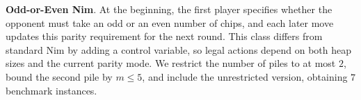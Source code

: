 \documentclass[review]{elsarticle}
\newcommand{\set}[1]{\{ #1 \}}
\newcommand{\tuple}[1]{\langle {#1} \rangle}
\newcommand{\true}{\top}
\newcommand{\statevar}{\mathcal{X}}
\newcommand{\act}{\mathcal{A}}
\newcommand{\constraint}{\mathcal{C}}
\newcommand{\estate}{\mathcal{E}}
\newcommand{\pre}{\mathtt{pre}}
\newcommand{\eff}{\mathtt{eff}}
\newcommand{\modulo}{\equiv}
\begin{document}
{\color{red}\textbf{Odd-or-Even Nim}. At the beginning, the first player specifies whether the opponent must take an odd or an even number of chips, and each later move updates this parity requirement for the next round.}
{\color{red}This class differs from standard Nim by adding a control variable, so legal actions depend on both heap sizes and the current parity mode.}
{\color{red}We restrict the number of piles to at most $2$, bound the second pile by $m \le 5$, and include the unrestricted version, obtaining $7$ benchmark instances.}
\end{document}
